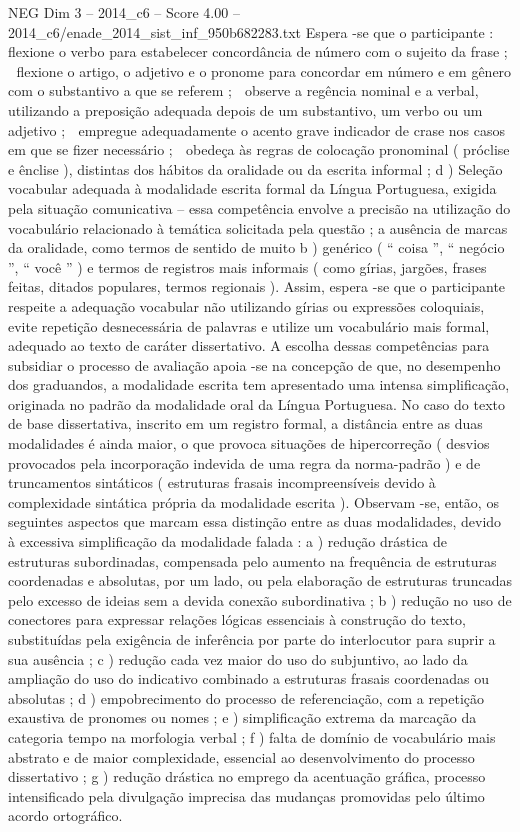 \begin{textsample}{NEG Dim 3 – 2014\_c6 – Score 4.00 – 2014\_c6/enade\_2014\_sist\_inf\_950b682283.txt}
Espera -se que o participante :  flexione o verbo para estabelecer concordância de número com o sujeito da frase ;  flexione o artigo, o adjetivo e o pronome para concordar em número e em gênero com o substantivo a que se referem ;  observe a regência nominal e a verbal, utilizando a preposição adequada depois de um substantivo, um verbo ou um adjetivo ;  empregue adequadamente o acento grave indicador de crase nos casos em que se fizer necessário ;  obedeça às regras de colocação pronominal ( próclise e ênclise ), distintas dos hábitos da oralidade ou da escrita informal ; d ) Seleção vocabular adequada à modalidade escrita formal da Língua Portuguesa, exigida pela situação comunicativa – essa competência envolve a precisão na utilização do vocabulário relacionado à temática solicitada pela questão ; a ausência de marcas da oralidade, como termos de sentido de muito b ) genérico ( “ coisa ”, “ negócio ”, “ você ” ) e termos de registros mais informais ( como gírias, jargões, frases feitas, ditados populares, termos regionais ).
Assim, espera -se que o participante respeite a adequação vocabular não utilizando gírias ou expressões coloquiais, evite repetição desnecessária de palavras e utilize um vocabulário mais formal, adequado ao texto de caráter dissertativo.
A escolha dessas competências para subsidiar o processo de avaliação apoia -se na concepção de que, no desempenho dos graduandos, a modalidade escrita tem apresentado uma intensa simplificação, originada no padrão da modalidade oral da Língua Portuguesa.
No caso do texto de base dissertativa, inscrito em um registro formal, a distância entre as duas modalidades é ainda maior, o que provoca situações de hipercorreção ( desvios provocados pela incorporação indevida de uma regra da norma-padrão ) e de truncamentos sintáticos ( estruturas frasais incompreensíveis devido à complexidade sintática própria da modalidade escrita ).
Observam -se, então, os seguintes aspectos que marcam essa distinção entre as duas modalidades, devido à excessiva simplificação da modalidade falada : a ) redução drástica de estruturas subordinadas, compensada pelo aumento na frequência de estruturas coordenadas e absolutas, por um lado, ou pela elaboração de estruturas truncadas pelo excesso de ideias sem a devida conexão subordinativa ; b ) redução no uso de conectores para expressar relações lógicas essenciais à construção do texto, substituídas pela exigência de inferência por parte do interlocutor para suprir a sua ausência ; c ) redução cada vez maior do uso do subjuntivo, ao lado da ampliação do uso do indicativo combinado a estruturas frasais coordenadas ou absolutas ; d ) empobrecimento do processo de referenciação, com a repetição exaustiva de pronomes ou nomes ; e ) simplificação extrema da marcação da categoria tempo na morfologia verbal ; f ) falta de domínio de vocabulário mais abstrato e de maior complexidade, essencial ao desenvolvimento do processo dissertativo ; g ) redução drástica no emprego da acentuação gráfica, processo intensificado pela divulgação imprecisa das mudanças promovidas pelo último acordo ortográfico.

\end{textsample}
